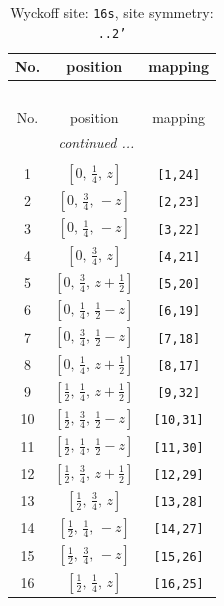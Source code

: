\documentclass[fleqn,8pt]{jsarticle}
\begin{document}
\renewcommand{\arraystretch}{1.2}
\begin{longtable}{ccc}
\caption{Wyckoff site: {\tt 16s}, site symmetry: {\tt ..2'}}
 \\
 \hline \hline
No. & position & mapping \\ \hline \endfirsthead

\multicolumn{2}{l}{\tablename\ \thetable{}} \\
 \hline \hline
No. & position & mapping \\ \hline \endhead

 \hline \hline
\multicolumn{2}{r}{\footnotesize\it continued ...} \\ \endfoot

 \hline \hline
\multicolumn{2}{r}{} \\ \endlastfoot

1 & $\left[ 0,\, \frac{1}{4},\, z \right]$ & {\tt [1,24]} \\ \hline
2 & $\left[ 0,\, \frac{3}{4},\, - z \right]$ & {\tt [2,23]} \\ \hline
3 & $\left[ 0,\, \frac{1}{4},\, - z \right]$ & {\tt [3,22]} \\ \hline
4 & $\left[ 0,\, \frac{3}{4},\, z \right]$ & {\tt [4,21]} \\ \hline
5 & $\left[ 0,\, \frac{3}{4},\, z + \frac{1}{2} \right]$ & {\tt [5,20]} \\ \hline
6 & $\left[ 0,\, \frac{1}{4},\, \frac{1}{2} - z \right]$ & {\tt [6,19]} \\ \hline
7 & $\left[ 0,\, \frac{3}{4},\, \frac{1}{2} - z \right]$ & {\tt [7,18]} \\ \hline
8 & $\left[ 0,\, \frac{1}{4},\, z + \frac{1}{2} \right]$ & {\tt [8,17]} \\ \hline
9 & $\left[ \frac{1}{2},\, \frac{1}{4},\, z + \frac{1}{2} \right]$ & {\tt [9,32]} \\ \hline
10 & $\left[ \frac{1}{2},\, \frac{3}{4},\, \frac{1}{2} - z \right]$ & {\tt [10,31]} \\ \hline
11 & $\left[ \frac{1}{2},\, \frac{1}{4},\, \frac{1}{2} - z \right]$ & {\tt [11,30]} \\ \hline
12 & $\left[ \frac{1}{2},\, \frac{3}{4},\, z + \frac{1}{2} \right]$ & {\tt [12,29]} \\ \hline
13 & $\left[ \frac{1}{2},\, \frac{3}{4},\, z \right]$ & {\tt [13,28]} \\ \hline
14 & $\left[ \frac{1}{2},\, \frac{1}{4},\, - z \right]$ & {\tt [14,27]} \\ \hline
15 & $\left[ \frac{1}{2},\, \frac{3}{4},\, - z \right]$ & {\tt [15,26]} \\ \hline
16 & $\left[ \frac{1}{2},\, \frac{1}{4},\, z \right]$ & {\tt [16,25]} \\
\end{longtable}
\end{document}

